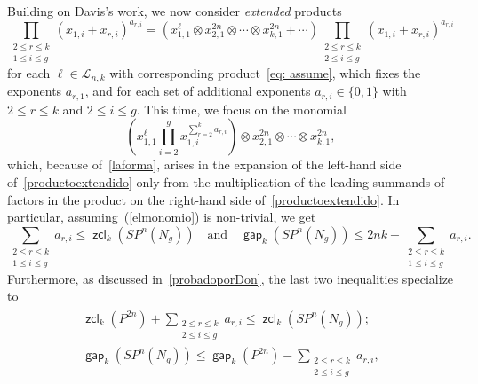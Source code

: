 \documentclass[amscd,amssymb,verbatim,10pt]{amsart}
\numberwithin{equation}{section}
\theoremstyle{plain}
\theoremstyle{definition}
\DeclareMathOperator{\zcl}{{\mathsf{zcl}}}
\DeclareMathOperator{\gap}{{\mathsf{gap}}}
\begin{document}
Building on Davis's work, we now consider \emph{extended} products
\begin{equation}\label{productoextendido}
     \prod_{\substack{2\le r\le k \\ 1\le i \le g}}\!\!\left(x_{1,i}+x_{r,i}\right)^{a_{r,i}}     =\left(x_{1,1}^{\ell}\otimes x_{2,1}^{2n}\otimes \cdots\otimes x_{k,1}^{2n}+\cdots\right)\!\prod_{\substack{2\le r\le k \\ 2\le i \le g}}\!\!\left(x_{1,i}+x_{r,i}\right)^{a_{r,i}}
\end{equation}
for each $\ell\in \mathcal{L}_{n,k}$ with corresponding product~\eqref{eq: assume}, which fixes the exponents $a_{r,1}$, and for each set of additional exponents $a_{r,i}\in \{0,1\}$ with $2\le r\le k$ and $2\le i \le g$. This time, we focus on the monomial
\begin{equation}\label{elmonomio}
    \left(x_{1,1}^\ell \prod_{i=2}^g x_{1,i}^{\sum_{r=2}^{k}a_{r,i}}\right)\otimes x_{2,1}^{2n}\otimes\cdots\otimes x_{k,1}^{2n},
\end{equation}
which, because of~\eqref{laforma}, arises in the expansion of the left-hand side of~\eqref{productoextendido} only from the multiplication of the leading summands of factors in the product on the right-hand side of~\eqref{productoextendido}. In particular, assuming~(\ref{elmonomio}) is non-trivial, we get
\begin{equation}\label{eq: imp1}
  \sum_{\substack{2\le r\le k \\ 1\le i \le g}}a_{r,i} \le\zcl_k(SP^n(N_g)) \quad\text{and}\quad 
  \gap_k(SP^n(N_g))  \le 2nk-\sum_{\substack{2\le r\le k \\ 1\le i \le g}}a_{r,i}.
  \end{equation}
Furthermore, as discussed in~\eqref{probadoporDon}, the last two inequalities specialize to
\begin{eqnarray}\label{eq: imp2}
  \begin{split}
\zcl_k(P^{2n})+\sum_{\substack{2\le r\le k \\ 2\le i \le g}}a_{r,i}\le\zcl_k(SP^n(N_g));
\\
\gap_k(SP^n(N_g))\le \gap_k(P^{2n})-\sum_{\substack{2\le r\le k \\ 2\le i \le g}}a_{r,i},
\end{split}
\end{eqnarray}
\end{document}

